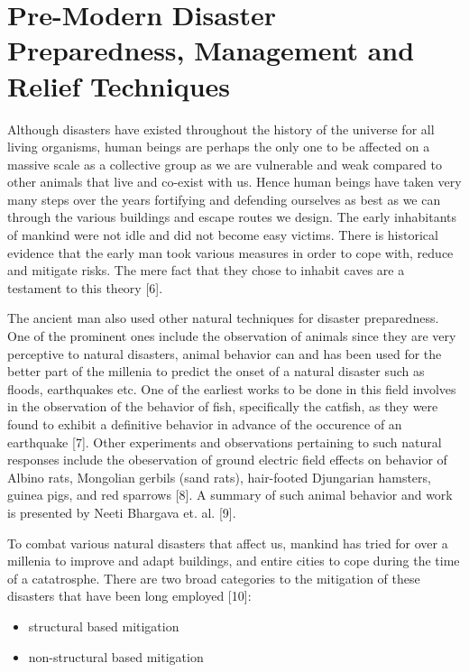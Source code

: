 \section{Pre-Modern Disaster Preparedness, Management and Relief Techniques}
\label{sec:pastwork:Pre-Modern Disaster Preparedness, Management and Relief Techniques}

Although disasters have existed throughout the history of the universe for all living organisms, human beings are perhaps the only one to be affected on a massive scale as a collective group as we are vulnerable and weak compared to other animals that live and co-exist with us. Hence human beings have taken very many steps over the years fortifying and defending ourselves as best as we can through the various buildings and escape routes we design. The early inhabitants of mankind were not idle and did not become easy victims. There is historical evidence that the early man took various measures in order to cope with, reduce and mitigate risks. The mere fact that they chose to inhabit caves are a testament to this theory [6].

The ancient man also used other natural techniques for disaster preparedness. One of the prominent ones include the observation of animals since they are very perceptive to natural disasters, animal behavior can and has been used for the better part of the millenia to predict the onset of a natural disaster such as floods, earthquakes etc. One of the earliest works to be done in this field involves in the observation of the behavior of fish, specifically the catfish, as they were found to exhibit a definitive behavior in advance of the occurence of an earthquake [7]. Other experiments and observations pertaining to such natural responses include the obeservation of ground electric field effects on behavior of Albino rats, Mongolian gerbils (sand rats), hair-footed Djungarian hamsters, guinea pigs, and red sparrows [8]. A summary of such animal behavior and work is presented by Neeti Bhargava et. al. [9].

To combat various natural disasters that affect us, mankind has tried for over a millenia to improve and adapt buildings, and entire cities to cope during the time of a catatrosphe. There are two broad categories to the mitigation of these disasters that have been long employed [10]:

\begin{itemize}
  \item structural based mitigation
  \item non-structural based mitigation
\end{itemize} 

